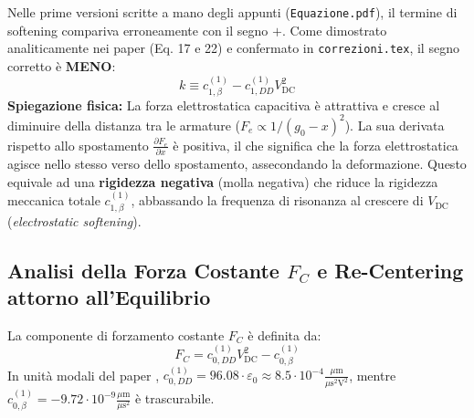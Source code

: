 \documentclass[11pt,a4paper]{article}
\begin{document}
\begin{corrbox}
Nelle prime versioni scritte a mano degli appunti (\texttt{Equazione.pdf}), il termine di softening compariva erroneamente con il segno $+$. Come dimostrato analiticamente nei paper \cite{Frangi2023} (Eq. 17 e 22) e confermato in \texttt{correzioni.tex}, il segno corretto è \textbf{MENO}:
\begin{equation}
    k \equiv c_{1,\beta}^{(1)} - c_{1,DD}^{(1)} V_{\text{DC}}^2
\end{equation}
\textbf{Spiegazione fisica:} La forza elettrostatica capacitiva è attrattiva e cresce al diminuire della distanza tra le armature ($F_e \propto 1/(g_0-x)^2$). La sua derivata rispetto allo spostamento $\frac{\partial F_e}{\partial x}$ è positiva, il che significa che la forza elettrostatica agisce nello stesso verso dello spostamento, assecondando la deformazione. Questo equivale ad una \textbf{rigidezza negativa} (molla negativa) che riduce la rigidezza meccanica totale $c_{1,\beta}^{(1)}$, abbassando la frequenza di risonanza al crescere di $V_{\text{DC}}$ (\emph{electrostatic softening}).
\end{corrbox}

\subsection{Analisi della Forza Costante \texorpdfstring{$F_C$}{FC} e Re-Centering attorno all'Equilibrio}
La componente di forzamento costante $F_C$ è definita da:
\begin{equation}
    F_C = c_{0,DD}^{(1)} V_{\text{DC}}^2 - c_{0,\beta}^{(1)}
\end{equation}
In unità modali del paper \cite{Frangi2023}, $c_{0,DD}^{(1)} = 96.08 \cdot \varepsilon_0 \approx 8.5 \cdot 10^{-4} \frac{\mu\text{m}}{\mu\text{s}^2 \text{V}^2}$, mentre $c_{0,\beta}^{(1)} = -9.72 \cdot 10^{-9} \frac{\mu\text{m}}{\mu\text{s}^2}$ è trascurabile.
\end{document}
